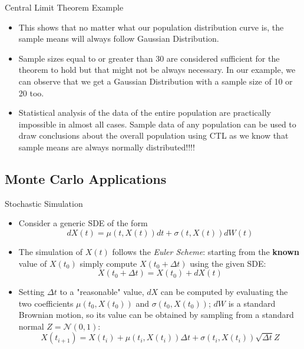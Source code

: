 \documentclass{beamer}
\begin{document}
\begin{frame}{Central Limit Theorem Example}
\begin{itemize}
    \item This shows that no matter what our population distribution curve is, the sample means will always follow Gaussian Distribution.
    \item Sample sizes equal to or greater than 30 are considered sufficient for the theorem to hold but that might not be always necessary. In our example, we can observe that we get a Gaussian Distribution with a sample size of 10 or 20 too.
    \item Statistical analysis of the data of the entire population are practically impossible in almost all cases. Sample data of any population can be used to draw conclusions about the overall population using CTL as we know that sample means are always normally distributed!!!!
\end{itemize}
\end{frame}

\subsection{Monte Carlo Applications}
\begin{frame}{Stochastic Simulation}
\begin{itemize}
    \item Consider a generic SDE of the form  
        \begin{equation*}
        dX(t) = \mu(t,X(t))dt + \sigma(t,X(t))dW(t) 
        \end{equation*}
    \item The simulation of $X(t)$ follows the \emph{Euler Scheme}: starting from the \textbf{known} value of $X(t_0)$ simply compute $X(t_0 +\Delta t)$ using the given SDE:
        \begin{equation*}
            X(t_0+\Delta t) = X(t_0) + dX(t)
        \end{equation*}
    \item Setting $\Delta t$ to a "reasonable" value, $dX$ can be computed by evaluating the two coefficients $\mu(t_0,X(t_0))$ and $\sigma(t_0,X(t_0))$; $dW$ is a standard Brownian motion, so its value can be obtained by sampling from a standard normal $Z=\mathcal{N}(0,1)$:
        \begin{equation*}
            X(t_{i+1}) = X(t_i) + \mu(t_i,X(t_i))\Delta t + \sigma(t_i,X(t_i))\sqrt{\Delta t}Z 
        \end{equation*}
    \end{itemize}
\end{frame}
\end{document}
